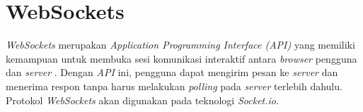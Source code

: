 \section{WebSockets}
\label{sec:WebSockets} 

\textit{WebSockets} merupakan \textit{Application Programming Interface (API)} yang memiliki kemampuan untuk membuka sesi komunikasi interaktif antara \textit{browser} pengguna dan \textit{server} \cite{websockets}. Dengan \textit{API} ini, pengguna dapat mengirim pesan ke \textit{server} dan menerima respon tanpa harus melakukan \textit{polling} pada \textit{server} terlebih dahulu. Protokol \textit{WebSockets} akan digunakan pada teknologi \textit{Socket.io}.


